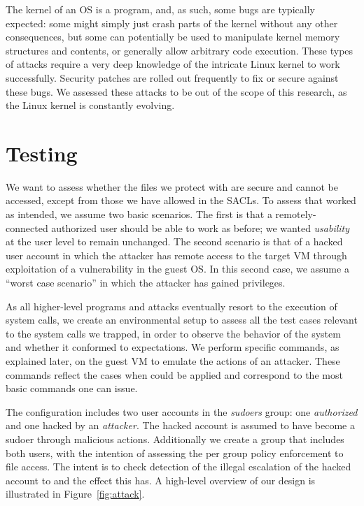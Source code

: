 \par The kernel of an \ac{OS} is a program, and, as such, some bugs are typically expected: some might simply just crash parts of the kernel without any other consequences, but some can potentially be used to manipulate kernel memory structures and contents, or generally allow arbitrary code execution. These types of attacks require a very deep knowledge of the intricate Linux kernel to work successfully. Security patches are rolled out frequently to fix or secure against these bugs. We assessed these attacks to be out of the scope of this research, as the Linux kernel is constantly evolving. 

\section{Testing}\label{sec:testing}

\par We want to assess whether the files we protect with  are secure and cannot be accessed, except from those we have allowed in the \acp{SACL}. To assess that  worked as intended, we assume two basic scenarios. The first is that a remotely-connected authorized user should be able to work as before; we wanted \emph{usability} at the user level to remain unchanged. The second scenario is that of a hacked user account in which the attacker has remote access to the target \ac{VM} through exploitation of a vulnerability in the guest \ac{OS}. In this second case, we assume a ``worst case scenario'' in which the attacker has gained  privileges. 

\par As all higher-level programs and attacks eventually resort to the execution of  system calls, we create an environmental setup to assess all the test cases relevant to the system calls we trapped, in order to observe the behavior of the system and whether it conformed to expectations. We perform specific commands, as explained later, on the guest \ac{VM} to emulate the actions of an attacker. These commands reflect the cases when  could be applied and correspond to the most basic commands one can issue. 

\par The configuration includes two user accounts in the \emph{sudoers} group: one \emph{authorized} and one hacked by an \emph{attacker}. The hacked account is assumed to have become a sudoer through malicious actions. Additionally we create a group that includes both users, with the intention of assessing the per group policy enforcement to file access. The intent is to check detection of the illegal escalation of the hacked account to  and the effect this has. A high-level overview of our design is illustrated in Figure~\ref{fig:attack}. 

